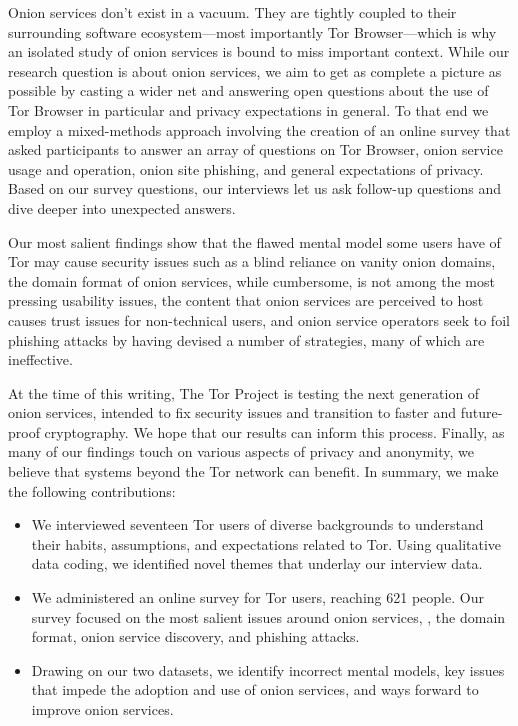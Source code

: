 Onion services don't exist in a vacuum.  They are tightly coupled to their
surrounding software ecosystem---most importantly Tor Browser---which is why an
isolated study of onion services is bound to miss important context.  While our
research question is about onion services, we aim to get as complete a picture
as possible by casting a wider net and answering open questions about the use of
Tor Browser in particular and privacy expectations in general.  To that end we
employ a mixed-methods approach involving the creation of an online survey that
asked participants to answer an array of questions on Tor Browser, onion service
usage and operation, onion site phishing, and general expectations of privacy.
Based on our survey questions, our interviews let us ask follow-up questions and
dive deeper into unexpected answers.

Our most salient findings show that \first the flawed mental model some users
have of Tor may cause security issues such as a blind reliance on vanity onion
domains, \second the domain format of onion services, while cumbersome, is not
among the most pressing usability issues, \third the content that onion services
are perceived to host causes trust issues for non-technical users, and \fourth
onion service operators seek to foil phishing attacks by having devised a number
of strategies, many of which are ineffective.

At the time of this writing, The Tor Project is testing the next generation of
onion services, intended to fix security issues and transition to faster and
future-proof cryptography.  We hope that our results can inform this process.
Finally, as many of our findings touch on various aspects of privacy and
anonymity, we believe that systems beyond the Tor network can benefit.  In
summary, we make the following contributions:

\begin{itemize}
    \item We interviewed seventeen Tor users of diverse backgrounds to
        understand their habits, assumptions, and expectations related to Tor.
        Using qualitative data coding, we identified novel themes that underlay
        our interview data.

    \item We administered an online survey for Tor users, reaching 621 people.
        Our survey focused on the most salient issues around onion services,
        \eg, the domain format, onion service discovery, and phishing attacks.

    \item Drawing on our two datasets, we identify \first incorrect mental
        models, \second key issues that impede the adoption and use of onion
        services, and \third ways forward to improve onion services.
\end{itemize}

